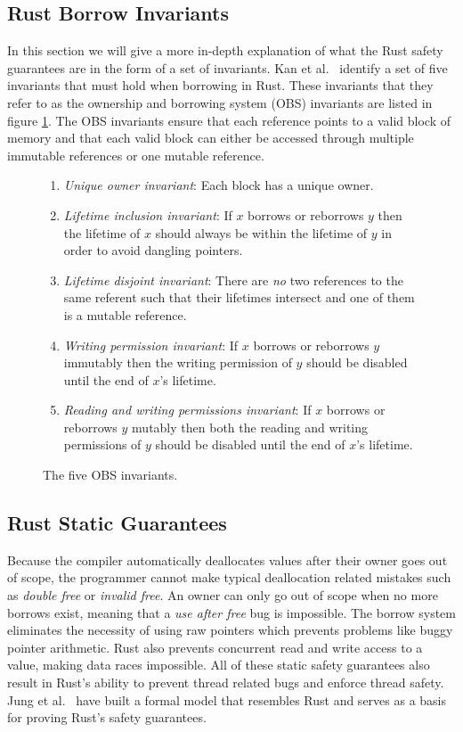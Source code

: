 \subsection{Rust Borrow Invariants}
\label{sec:obsinvariants}
In this section we will give a more in-depth explanation of what the Rust safety guarantees are in the form of a set of invariants.
Kan et al.\ \cite{kan2020executable} identify a set of five invariants that must hold when borrowing in Rust.
These invariants that they refer to as the ownership and borrowing system (OBS) invariants are listed in figure \ref{fig:obsinvariants}.
The OBS invariants ensure that each reference points to a valid block of memory and that each valid block can either be accessed through multiple immutable references or one mutable reference.

\begin{figure}[h]
\centering
\begin{enumerate}
    \item \textit{Unique owner invariant}: Each block has a unique owner.
    \item \textit{Lifetime inclusion invariant}: If $x$ borrows or reborrows $y$ then the lifetime of $x$ should always be within the lifetime of $y$ in order to avoid dangling pointers.
    \item \textit{Lifetime disjoint invariant}: There are \textit{no} two references to the same referent such that their lifetimes intersect and one of them is a mutable reference.
    \item \textit{Writing permission invariant}: If $x$ borrows or reborrows $y$ immutably then the writing permission of $y$ should be disabled until the end of $x$'s lifetime.
    \item \textit{Reading and writing permissions invariant}: If $x$ borrows or reborrows $y$ mutably then both the reading and writing permissions of $y$ should be disabled until the end of $x$'s lifetime.
\end{enumerate}
\caption{The five OBS invariants.\cite{kan2020executable}}
\label{fig:obsinvariants}
\end{figure}

\subsection{Rust Static Guarantees}
Because the compiler automatically deallocates values after their owner goes out of scope, the programmer cannot make typical deallocation related mistakes such as \textit{double free} or \textit{invalid free}.
An owner can only go out of scope when no more borrows exist, meaning that a \textit{use after free} bug is impossible.
The borrow system eliminates the necessity of using raw pointers which prevents problems like buggy pointer arithmetic.
Rust also prevents concurrent read and write access to a value, making data races impossible.
All of these static safety guarantees also result in Rust's ability to prevent thread related bugs and enforce thread safety.
Jung et al.\ \cite{10.1145/3158154} have built a formal model that resembles Rust and serves as a basis for proving Rust's safety guarantees.

